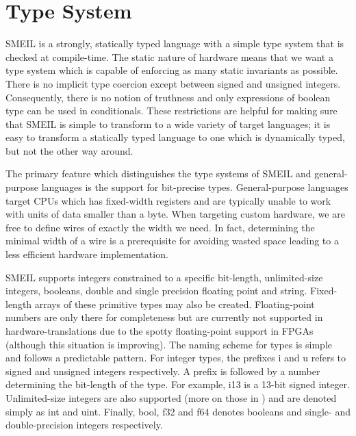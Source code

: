 
\section{Type System}
\label{sec:typesys}
SMEIL is a strongly, statically typed language with a simple type system that is
checked at compile-time. The static nature of hardware means that we want a
type system which is capable of enforcing as many static invariants as
possible. There is no implicit type coercion except between signed and unsigned
integers.  Consequently, there is no notion of truthness and only expressions of
boolean type can be used in conditionals. These restrictions are helpful for
making sure that SMEIL is simple to transform to a wide variety of target
languages; it is easy to transform a statically typed language to one which is
dynamically typed, but not the other way around.

The primary feature which distinguishes the type systems of SMEIL and
general-purpose languages is the support for bit-precise types. General-purpose
languages target CPUs which has fixed-width registers and are typically unable
to work with units of data smaller than a byte. When targeting custom hardware,
we are free to define wires of exactly the width we need. In fact, determining
the minimal width of a wire is a prerequisite for avoiding wasted space leading
to a less efficient hardware implementation.

SMEIL supports integers constrained to a specific bit-length, unlimited-size
integers, booleans, double and single precision floating point and
string. Fixed-length arrays of these primitive types may also be
created. Floating-point numbers are only there for completeness but are
currently not supported in hardware-translations due to the spotty
floating-point support in FPGAs (although this situation is improving). The
naming scheme for types is simple and follows a predictable pattern. For integer
types, the prefixes {\ttfamily i} and {\ttfamily u} refers to signed and unsigned integers
respectively. A prefix is followed by a number determining the bit-length of the
type. For example, {\ttfamily i13} is a 13-bit signed integer. Unlimited-size integers
are also supported (more on those in ) and are denoted simply
as {\ttfamily int} and {\ttfamily uint}. Finally, {\ttfamily bool}, {\ttfamily f32} and {\ttfamily f64}
denotes booleans and single- and double-precision integers respectively.

